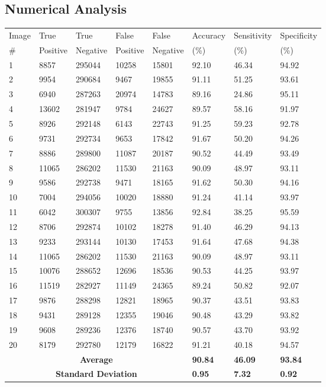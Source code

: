 \documentclass{article}
\begin{document}
\subsection{Numerical Analysis}
\begin{center}
    \begin{tabular}{|l|l|l|l|l|l|l|l|}
    \hline
        Image & True & True & False & False & Accuracy & Sensitivity & Specificity \\
        \# & Positive & Negative & Positive & Negative & (\%) &  (\%) & (\%) \\ \hline
        1 & 8857 & 295044 & 10258 & 15801 & 92.10 & 46.34 & 94.92 \\ \hline
        2 & 9954 & 290684 & 9467 & 19855 & 91.11 & 51.25 & 93.61 \\ \hline
        3 & 6940 & 287263 & 20974 & 14783 & 89.16 & 24.86 & 95.11 \\ \hline
        4 & 13602 & 281947 & 9784 & 24627 & 89.57 & 58.16 & 91.97 \\ \hline
        5 & 8926 & 292148 & 6143 & 22743 & 91.25 & 59.23 & 92.78 \\ \hline
        6 & 9731 & 292734 & 9653 & 17842 & 91.67 & 50.20 & 94.26 \\ \hline
        7 & 8886 & 289800 & 11087 & 20187 & 90.52 & 44.49 & 93.49 \\ \hline
        8 & 11065 & 286202 & 11530 & 21163 & 90.09 & 48.97 & 93.11 \\ \hline
        9 & 9586 & 292738 & 9471 & 18165 & 91.62 & 50.30 & 94.16 \\ \hline
        10 & 7004 & 294056 & 10020 & 18880 & 91.24 & 41.14 & 93.97 \\ \hline
        11 & 6042 & 300307 & 9755 & 13856 & 92.84 & 38.25 & 95.59 \\ \hline
        12 & 8706 & 292874 & 10102 & 18278 & 91.40 & 46.29 & 94.13 \\ \hline
        13 & 9233 & 293144 & 10130 & 17453 & 91.64 & 47.68 & 94.38 \\ \hline
        14 & 11065 & 286202 & 11530 & 21163 & 90.09 & 48.97 & 93.11 \\ \hline
        15 & 10076 & 288652 & 12696 & 18536 & 90.53 & 44.25 & 93.97 \\ \hline
        16 & 11519 & 282927 & 11149 & 24365 & 89.24 & 50.82 & 92.07 \\ \hline
        17 & 9876 & 288298 & 12821 & 18965 & 90.37 & 43.51 & 93.83 \\ \hline
        18 & 9431 & 289128 & 12355 & 19046 & 90.48 & 43.29 & 93.82 \\ \hline
        19 & 9608 & 289236 & 12376 & 18740 & 90.57 & 43.70 & 93.92 \\ \hline
        20 & 8179 & 292780 & 12179 & 16822 & 91.21 & 40.18 & 94.57 \\ \hline
        \multicolumn{5}{|c|}{\textbf{Average}}  & \textbf{90.84} & \textbf{46.09} & \textbf{93.84} \\ \hline
        \multicolumn{5}{|c|}{\textbf{Standard Deviation}} & \textbf{0.95} & \textbf{7.32} & \textbf{0.92} \\ \hline
    \end{tabular}
\end{center}
\end{document}
